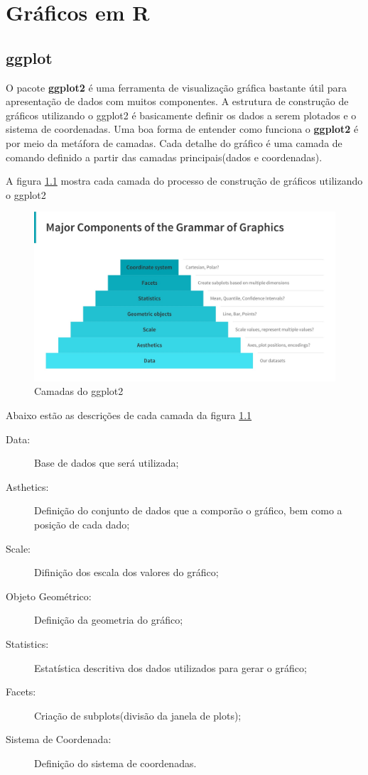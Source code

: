\documentclass[12pt,a4paper,oneside]{erdc}
\begin{document}
%
%
%



\chapter{Gráficos em R}

	\section{ggplot}
	O pacote \textbf{ggplot2} é uma ferramenta de visualização gráfica bastante útil para apresentação de dados com muitos componentes. A estrutura de construção de gráficos utilizando o ggplot2 é basicamente definir os dados a serem plotados e o sistema de coordenadas. Uma boa forma de entender como funciona o \textbf{ggplot2} é por meio da metáfora de camadas. Cada detalhe do gráfico é uma camada de comando definido a partir das camadas principais(dados e coordenadas).
	
	A figura \ref{fig:f06-01} mostra cada camada do processo de construção de gráficos utilizando o ggplot2 
	
	\begin{figure}[htpb]
		\centering
		\includegraphics[width=0.7\linewidth]{../figs/BP_Curso_TecComp_00_2019_f06-01}
		\caption{Camadas do ggplot2}
		\label{fig:f06-01}
	\end{figure}

Abaixo estão as descrições de cada camada da figura \ref{fig:f06-01}

\begin{description}
	\item [Data:] Base de dados que será utilizada;
	\item [Asthetics:] Definição do conjunto de dados que a comporão o gráfico, bem como a posição de cada dado;
	\item [Scale:] Difinição dos escala dos valores do gráfico;
	\item [Objeto Geométrico:] Definição da geometria do gráfico;
	\item [Statistics:] Estatística descritiva dos dados utilizados para gerar o gráfico;
	\item [Facets:] Criação de subplots(divisão da janela de plots);
	\item [Sistema de Coordenada:] Definição do sistema de coordenadas.
\end{description}
\end{document}

